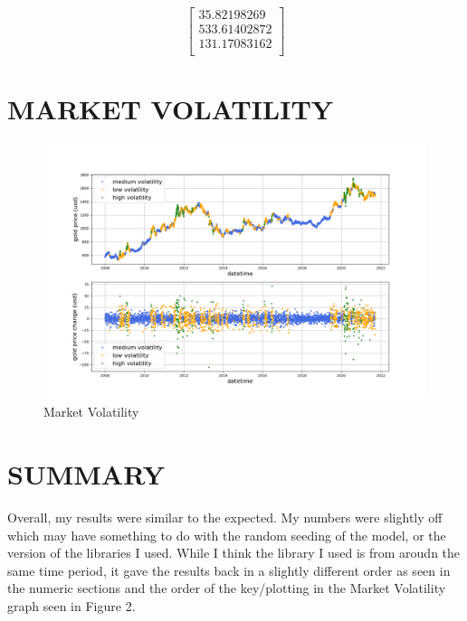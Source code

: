 \documentclass{article}
\begin{document}
\[
\begin{bmatrix}
	35.82198269\\
	533.61402872\\
	131.17083162\\
\end{bmatrix}
\]

\section{\MakeUppercase{Market Volatility}}
\begin{figure}[!htb]
	\centering
	\begin{minipage}{1\textwidth}
			\centering
			\includegraphics[width=1\linewidth]{../section8.png}
			\caption{Market Volatility}
	\end{minipage}\hfill
\end{figure}


\section{\MakeUppercase{Summary}}
Overall, my results were similar to the expected. My numbers were slightly off which may have something to do with the random seeding of the model, or the version of the libraries I used. While I think the library I used is from aroudn the same time period, it gave the results back in  a slightly different order as seen in the numeric sections and the order of the key/plotting in the Market Volatility graph seen in Figure 2.
\end{document}
